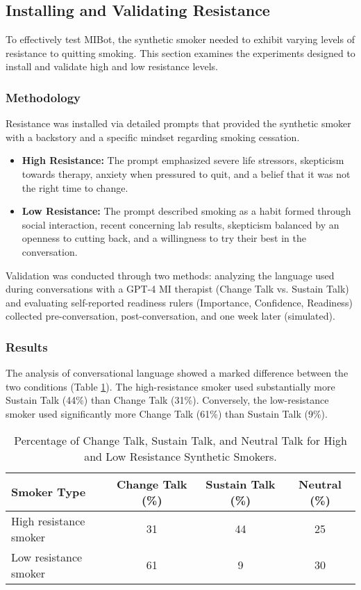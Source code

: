 \subsection{Installing and Validating Resistance}

To effectively test MIBot, the synthetic smoker needed to exhibit varying levels of resistance to quitting smoking. This section examines the experiments designed to install and validate high and low resistance levels.

\subsubsection{Methodology}

Resistance was installed via detailed prompts that provided the synthetic smoker with a backstory and a specific mindset regarding smoking cessation.
\begin{itemize}
    \item \textbf{High Resistance:} The prompt emphasized severe life stressors, skepticism towards therapy, anxiety when pressured to quit, and a belief that it was not the right time to change.
    \item \textbf{Low Resistance:} The prompt described smoking as a habit formed through social interaction, recent concerning lab results, skepticism balanced by an openness to cutting back, and a willingness to try their best in the conversation.
\end{itemize}
Validation was conducted through two methods: analyzing the language used during conversations with a GPT-4 MI therapist (Change Talk vs. Sustain Talk) and evaluating self-reported readiness rulers (Importance, Confidence, Readiness) collected pre-conversation, post-conversation, and one week later (simulated).

\subsubsection{Results}

The analysis of conversational language showed a marked difference between the two conditions (Table \ref{tab:resistance_change_sustain}). The high-resistance smoker used substantially more Sustain Talk (44\%) than Change Talk (31\%). Conversely, the low-resistance smoker used significantly more Change Talk (61\%) than Sustain Talk (9\%).

\begin{table}[h]
\centering
\caption{Percentage of Change Talk, Sustain Talk, and Neutral Talk for High and Low Resistance Synthetic Smokers.}
\label{tab:resistance_change_sustain}
\begin{tabular}{|l|c|c|c|}
\hline
\textbf{Smoker Type} & \textbf{Change Talk (\%)} & \textbf{Sustain Talk (\%)} & \textbf{Neutral (\%)} \\ \hline
High resistance smoker & 31 & 44 & 25 \\ \hline
Low resistance smoker & 61 & 9 & 30 \\ \hline
\end{tabular}
\end{table}

